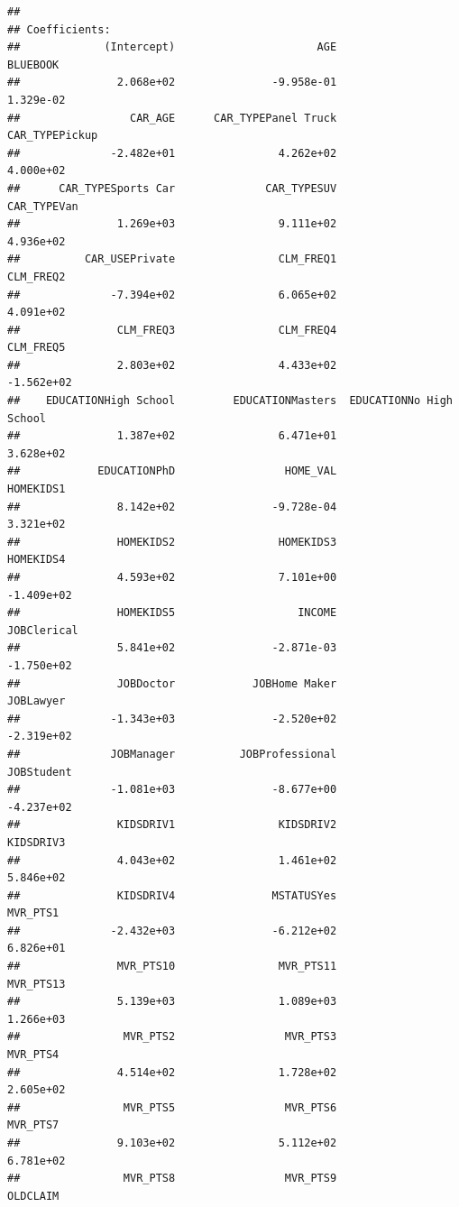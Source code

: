 \documentclass[]{article}
\begin{document}
\begin{verbatim}
## 
## Coefficients:
##             (Intercept)                      AGE                 BLUEBOOK  
##               2.068e+02               -9.958e-01                1.329e-02  
##                 CAR_AGE      CAR_TYPEPanel Truck           CAR_TYPEPickup  
##              -2.482e+01                4.262e+02                4.000e+02  
##      CAR_TYPESports Car              CAR_TYPESUV              CAR_TYPEVan  
##               1.269e+03                9.111e+02                4.936e+02  
##          CAR_USEPrivate                CLM_FREQ1                CLM_FREQ2  
##              -7.394e+02                6.065e+02                4.091e+02  
##               CLM_FREQ3                CLM_FREQ4                CLM_FREQ5  
##               2.803e+02                4.433e+02               -1.562e+02  
##    EDUCATIONHigh School         EDUCATIONMasters  EDUCATIONNo High School  
##               1.387e+02                6.471e+01                3.628e+02  
##            EDUCATIONPhD                 HOME_VAL                HOMEKIDS1  
##               8.142e+02               -9.728e-04                3.321e+02  
##               HOMEKIDS2                HOMEKIDS3                HOMEKIDS4  
##               4.593e+02                7.101e+00               -1.409e+02  
##               HOMEKIDS5                   INCOME              JOBClerical  
##               5.841e+02               -2.871e-03               -1.750e+02  
##               JOBDoctor            JOBHome Maker                JOBLawyer  
##              -1.343e+03               -2.520e+02               -2.319e+02  
##              JOBManager          JOBProfessional               JOBStudent  
##              -1.081e+03               -8.677e+00               -4.237e+02  
##               KIDSDRIV1                KIDSDRIV2                KIDSDRIV3  
##               4.043e+02                1.461e+02                5.846e+02  
##               KIDSDRIV4               MSTATUSYes                 MVR_PTS1  
##              -2.432e+03               -6.212e+02                6.826e+01  
##               MVR_PTS10                MVR_PTS11                MVR_PTS13  
##               5.139e+03                1.089e+03                1.266e+03  
##                MVR_PTS2                 MVR_PTS3                 MVR_PTS4  
##               4.514e+02                1.728e+02                2.605e+02  
##                MVR_PTS5                 MVR_PTS6                 MVR_PTS7  
##               9.103e+02                5.112e+02                6.781e+02  
##                MVR_PTS8                 MVR_PTS9                 OLDCLAIM  

\end{verbatim}
\end{document}
